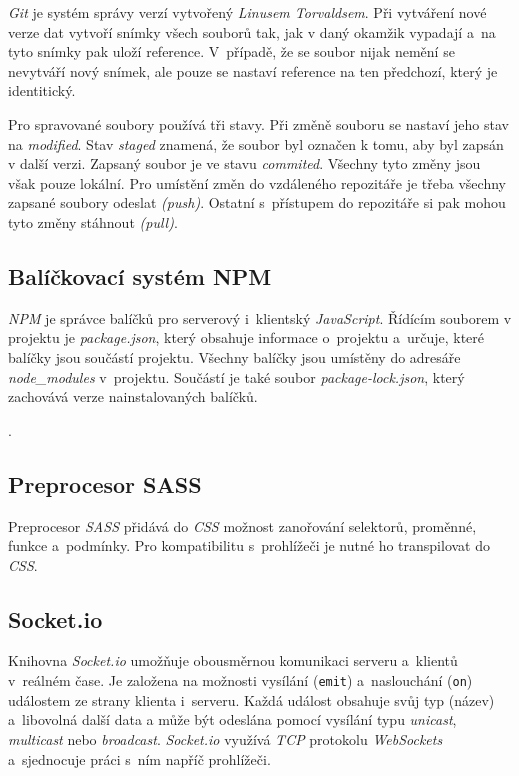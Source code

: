 \documentclass[a4paper,12pt]{article}
\def\code#1{\texttt{#1}}
\begin{document}
\textit{Git} je systém správy verzí vytvořený \textit{Linusem Torvaldsem}. Při vytváření nové verze dat vytvoří snímky všech souborů tak, jak v daný okamžik vypadají a~na tyto snímky pak uloží reference. V~případě, že se soubor nijak nemění se nevytváří nový snímek, ale pouze se nastaví reference na ten předchozí, který je identitický.~\cite{git}

Pro spravované soubory používá tři stavy. Při změně souboru se nastaví jeho stav na \textit{modified}. Stav \textit{staged} znamená, že soubor byl označen k tomu, aby byl zapsán v další verzi. Zapsaný soubor je ve stavu \textit{commited}. Všechny tyto změny jsou však pouze lokální. Pro umístění změn do vzdáleného repozitáře je třeba všechny zapsané soubory odeslat \textit{(push)}. Ostatní s~přístupem do repozitáře si pak mohou tyto změny stáhnout \textit{(pull)}.~\cite{git}

\subsection{Balíčkovací systém NPM}

\textit{NPM} je správce balíčků pro serverový i~klientský \textit{JavaScript}. Řídícím souborem v projektu je \textit{package.json}, který obsahuje informace o~projektu a~určuje, které balíčky jsou součástí projektu.  Všechny balíčky jsou umístěny do adresáře \textit{node\_modules} v~projektu. Součástí je také soubor \textit{package-lock.json}, který zachovává verze nainstalovaných balíčků.~\cite{nodebook}

.

\vspace*{-1.5cm}
\subsection{Preprocesor SASS}

Preprocesor \textit{SASS} přidává do \textit{CSS} možnost zanořování selektorů, proměnné, funkce a~podmínky. Pro kompatibilitu s~prohlížeči je nutné ho transpilovat do \textit{CSS}.~\cite{sass}

\subsection{Socket.io}

Knihovna \textit{Socket.io} umožňuje obousměrnou komunikaci serveru a~klientů v~reálném čase. Je založena na možnosti vysílání (\code{emit}) a~naslouchání (\code{on}) událostem ze strany klienta i~serveru. Každá událost obsahuje svůj typ (název) a~libovolná další data a může být odeslána pomocí vysílání typu \textit{unicast}, \textit{multicast} nebo \textit{broadcast}. \textit{Socket.io} využívá \textit{TCP} protokolu \textit{WebSockets} a~sjednocuje práci s~ním napříč prohlížeči.~\cite{sockets}
\end{document}
